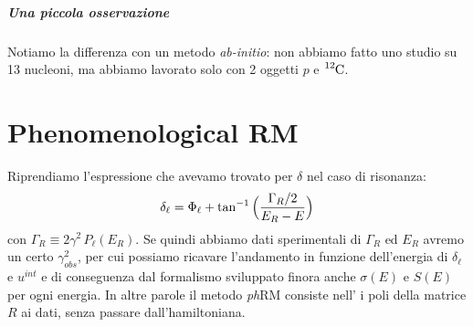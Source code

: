 \subparagraph{Una piccola osservazione} Notiamo la differenza con un metodo \textit{ab-initio}: non abbiamo fatto uno studio su 13 nucleoni, ma abbiamo lavorato solo con 2 oggetti $p$ e $\ce{^{12}C}$.

\newpage

\section{Phenomenological RM}
Riprendiamo l'espressione che avevamo trovato per $\delta$ nel caso di risonanza:
$$\delta_\ell = \Phi_\ell + \tan^{-1} {\Bigl ( \frac{\Gamma_R /2}{E_R-E} \Bigr )}$$
con $\Gamma_R\equiv 2\gamma^2 \, P_\ell(E_R)$. Se quindi abbiamo dati sperimentali di $\Gamma_R$ ed $E_R$ avremo un certo $\gamma^2_{obs}$, per cui possiamo ricavare l'andamento in funzione dell'energia di $\delta_\ell$ e $u^{int}$ e di conseguenza dal formalismo sviluppato finora anche $\sigma(E)$ e $S(E)$ per ogni energia. In altre parole il metodo \textit{ph}RM consiste nell' i poli della matrice $R$ ai dati, senza passare dall'hamiltoniana.

